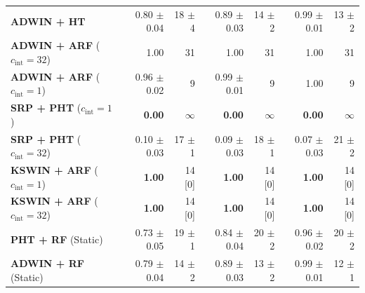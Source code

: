\begin{table}[t]
\begin{tabular}{@{}lrrrrrr@{}}
    \midrule
    \textbf{ADWIN + HT}                            & 0.80 {\small $\pm$0.04} & 18 {\small $\pm$4} & 0.89 {\small $\pm$0.03} & 14 {\small $\pm$2} & 0.99 {\small $\pm$0.01} & 13 {\small $\pm$2} \\
    \textbf{ADWIN + ARF} ($c_{\mathrm{int}} = 32$) & 1.00 & 31 & 1.00 & 31 & 1.00 & 31 \\
    \textbf{ADWIN + ARF} ($c_{\mathrm{int}} = 1$)  & 0.96 {\small $\pm$0.02} & 9 & 0.99 {\small $\pm$0.01} & 9 & 1.00 & 9 \\
    \midrule
    \textbf{SRP + PHT} ($c_{\mathrm{int}} = 1$)    & \textbf{0.00} & $\infty$ & \textbf{0.00} & $\infty$ & \textbf{0.00} & $\infty$ \\
    \textbf{SRP + PHT} ($c_{\mathrm{int}} = 32$)   & 0.10 {\small $\pm$0.03} & 17 {\small $\pm$1} & 0.09 {\small $\pm$0.03} & 18 {\small $\pm$1} & 0.07 {\small $\pm$0.03} & 21 {\small $\pm$2} \\
    \textbf{KSWIN + ARF} ($c_{\mathrm{int}} = 1$)  & \textbf{1.00} & 14 [0] & \textbf{1.00} & 14 [0] & \textbf{1.00} & 14 [0] \\
    \textbf{KSWIN + ARF} ($c_{\mathrm{int}} = 32$) & \textbf{1.00} & 14 [0] & \textbf{1.00} & 14 [0] & \textbf{1.00} & 14 [0] \\
    \midrule
    \textbf{PHT + RF} (Static)                     & 0.73 {\small $\pm$0.05} & 19 {\small $\pm$1} & 0.84 {\small $\pm$0.04} & 20 {\small $\pm$2} & 0.96 {\small $\pm$0.02} & 20 {\small $\pm$2} \\
    \textbf{ADWIN + RF} (Static)                   & 0.79 {\small $\pm$0.04} & 14 {\small $\pm$2} & 0.89 {\small $\pm$0.03} & 13 {\small $\pm$2} & 0.99 {\small $\pm$0.01} & 12 {\small $\pm$1} \\
    \bottomrule
  \end{tabular}
\end{table}
